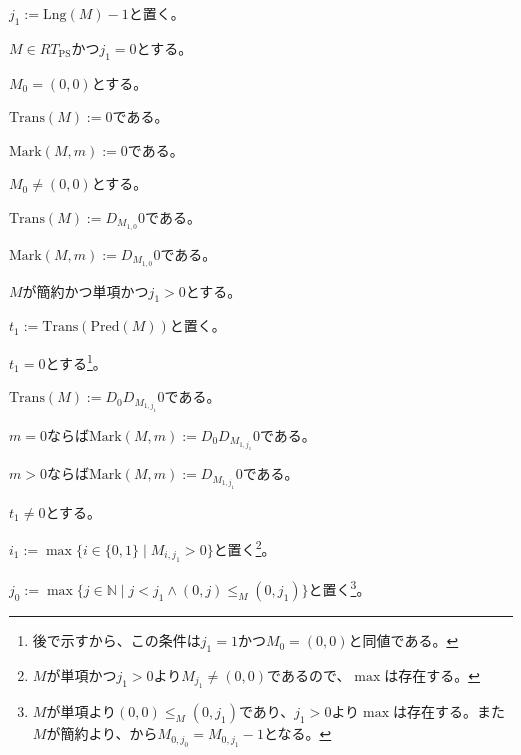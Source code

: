 \documentclass[dvipdfmx,uplatex]{jsarticle}
\theoremstyle{customnonumberbreakfortheorem}
\theoremstyle{customnonumberbreakforproof}
\begin{document}
\begin{nenumerate}
	\item \(j_1 := \textrm{Lng}(M) - 1\)と置く。
	\item \(M \in RT_{\textrm{PS}}\)かつ\(j_1 = 0\)とする。
	\begin{nenumerate}
		\item \(M_0 = (0,0)\)とする。
		\begin{nenumerate}
			\item \(\textrm{Trans}(M) := 0\)である。
			\item \(\textrm{Mark}(M,m) := 0\)である。
		\end{nenumerate}
		\item \(M_0 \neq (0,0)\)とする。
		\begin{nenumerate}
			\item \(\textrm{Trans}(M) := D_{M_{1,0}} 0\)である。
			\item \(\textrm{Mark}(M,m) := D_{M_{1,0}} 0\)である。
		\end{nenumerate}
	\end{nenumerate}
	\item \(M\)が簡約かつ単項かつ\(j_1 > 0\)とする。
	\begin{nenumerate}
		\item \(t_1 := \textrm{Trans}(\textrm{Pred}(M))\)と置く。
		\item \(t_1 = 0\)とする\footnote{後で示すから、この条件は\(j_1 = 1\)かつ\(M_0 = (0,0)\)と同値である。}。
		\begin{nenumerate}
			\item \(\textrm{Trans}(M) := D_0 D_{M_{1,j_1}} 0\)である。
			\item \(m = 0\)ならば\(\textrm{Mark}(M,m) := D_0 D_{M_{1,j_1}} 0\)である。
			\item \(m > 0\)ならば\(\textrm{Mark}(M,m) := D_{M_{1,j_1}} 0\)である。
		\end{nenumerate}
		\item \(t_1 \neq 0\)とする。
		\begin{nenumerate}
			\item \(i_1 := \max \{i \in \{0,1\} \mid M_{i,j_1} > 0\}\)と置く\footnote{\(M\)が単項かつ\(j_1 > 0\)より\(M_{j_1} \neq (0,0)\)であるので、\(\max\)は存在する。}。
			\item \(j_0 := \max \{j \in \mathbb{N} \mid j < j_1 \wedge (0,j) \leq_M (0,j_1)\}\)と置く\footnote{\(M\)が単項より\((0,0) \leq_M (0,j_1)\)であり、\(j_1 > 0\)より\(\max\)は存在する。また\(M\)が簡約より、から\(M_{0,j_0} = M_{0,j_1} - 1\)となる。}。

\end{nenumerate}
\end{nenumerate}
\end{nenumerate}
\end{document}
